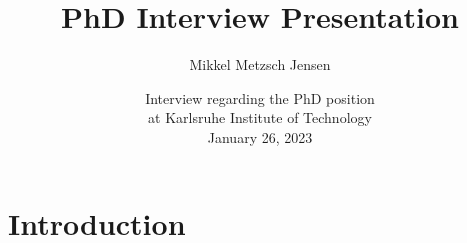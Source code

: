 \documentclass[
	10pt, %
]{beamer}
\title[PhD Interview Presentation]{PhD Interview Presentation} %
\author[Mikkel Metzsch Jensen]{Mikkel Metzsch Jensen} %
\institute[UiO]{University of Oslo} %
\date[January 26, 2023]{Interview regarding the PhD position \\ at Karlsruhe Institute of Technology \\ January 26, 2023} %
\begin{document}

\begin{frame}
	\titlepage %
\end{frame}



	



\section{Introduction}
\end{document}

